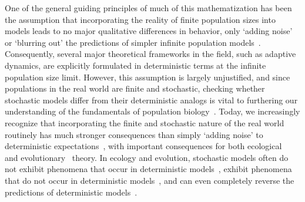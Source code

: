 One of the general guiding principles of much of this mathematization has been the assumption that incorporating the reality of finite population sizes into models leads to no major qualitative differences in behavior, only `adding noise' or `blurring out' the predictions of simpler infinite population models~\citep{page_unifying_2002}. Consequently, several major theoretical frameworks in the field, such as adaptive dynamics, are explicitly formulated in deterministic terms at the infinite population size limit. However, this assumption is largely unjustified, and since populations in the real world are finite and stochastic, checking whether stochastic models differ from their deterministic analogs is vital to furthering our understanding of the fundamentals of population biology~\citep{hastings_transients_2004, coulson_skeletons_2004, shoemaker_integrating_2020}. Today, we increasingly recognize that incorporating the finite and stochastic nature of the real world routinely has much stronger consequences than simply `adding noise' to deterministic expectations~\citep{boettiger_noise_2018}, with important consequences for both ecological~\citep{schreiber_does_2022} and evolutionary~\citep{delong_stochasticity_2023} theory. In ecology and evolution, stochastic models often do not exhibit phenomena that occur in deterministic models~\citep{proulx_what_2005, johansson_will_2006, claessen_delayed_2007,  wakano_evolutionary_2013, debarre_evolutionary_2016, johnson_two-dimensional_2021}, exhibit phenomena that do not occur in deterministic models~\citep{rogers_demographic_2012, rogers_spontaneous_2012, rogers_modes_2015, veller_drift-induced_2017, delong_stochasticity_2023}, and can even completely reverse the predictions of deterministic models~\citep{houchmandzadeh_selection_2012,houchmandzadeh_fluctuation_2015,constable_demographic_2016,mcleod_social_2019}.

